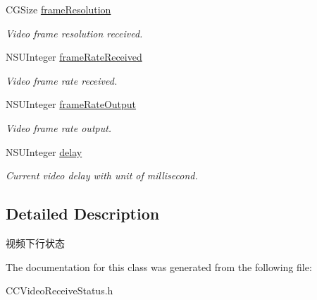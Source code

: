 \begin{DoxyCompactItemize}
\mbox{\label{interface_c_c_video_receive_status_a0b2f9110209c50fb03d978b2a07daf0f}} 
C\+G\+Size \hyperlink{interface_c_c_video_receive_status_a0b2f9110209c50fb03d978b2a07daf0f}{frame\+Resolution}
\begin{DoxyCompactList}\small\item\em Video frame resolution received. \end{DoxyCompactList}\item 
\mbox{\label{interface_c_c_video_receive_status_a6aa8b0cf7dba0d72de75e217b860d987}} 
N\+S\+U\+Integer \hyperlink{interface_c_c_video_receive_status_a6aa8b0cf7dba0d72de75e217b860d987}{frame\+Rate\+Received}
\begin{DoxyCompactList}\small\item\em Video frame rate received. \end{DoxyCompactList}\item 
\mbox{\label{interface_c_c_video_receive_status_abc2131590762344713e4358bcdcd6f15}} 
N\+S\+U\+Integer \hyperlink{interface_c_c_video_receive_status_abc2131590762344713e4358bcdcd6f15}{frame\+Rate\+Output}
\begin{DoxyCompactList}\small\item\em Video frame rate output. \end{DoxyCompactList}\item 
\mbox{\label{interface_c_c_video_receive_status_a930689025b59cc82ab1e2986cd7c80ab}} 
N\+S\+U\+Integer \hyperlink{interface_c_c_video_receive_status_a930689025b59cc82ab1e2986cd7c80ab}{delay}
\begin{DoxyCompactList}\small\item\em Current video delay with unit of millisecond. \end{DoxyCompactList}\end{DoxyCompactItemize}


\subsection{Detailed Description}
视频下行状态 

The documentation for this class was generated from the following file\+:\begin{DoxyCompactItemize}
\item 
C\+C\+Video\+Receive\+Status.\+h\end{DoxyCompactItemize}
